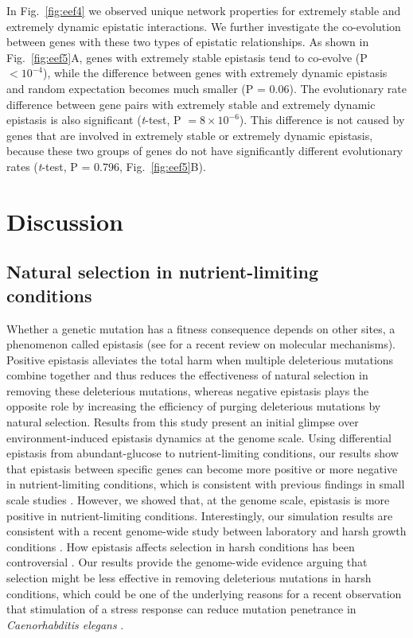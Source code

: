 \documentclass[10pt]{article}
\newcommand{\Fig}{Fig.}
\newcommand{\citep}{\cite}
\newcommand{\citet}{\citep}
\begin{document}
In \Fig~\ref{fig:eef4} we observed unique network properties for extremely stable
and extremely dynamic epistatic interactions. We further investigate
the co-evolution between genes with these two types of epistatic
relationships. As shown in \Fig~\ref{fig:eef5}A, genes with extremely stable
epistasis tend to co-evolve (P $< 10^{-4}$), while the difference between
genes with extremely dynamic epistasis and random expectation becomes
much smaller (P = 0.06). The evolutionary rate difference between gene
pairs with extremely stable and extremely dynamic epistasis is also
significant (\textit{t}-test, P $= 8\times 10^{-6}$). This difference is not caused by
genes that are involved in extremely stable or extremely dynamic
epistasis, because these two groups of genes do not have significantly
different evolutionary rates (\textit{t}-test, P = 0.796, \Fig~\ref{fig:eef5}B).

\section*{Discussion}


\subsection*{Natural selection in nutrient-limiting conditions}

Whether a genetic mutation has a fitness consequence depends on other
sites, a phenomenon called epistasis (see \citet{Lehner2011} for a
recent review on
molecular mechanisms). Positive epistasis alleviates the total harm
when multiple deleterious mutations combine together and thus reduces
the effectiveness of natural selection in removing these deleterious
mutations, whereas negative epistasis plays the opposite role by
increasing the efficiency of purging deleterious mutations by natural
selection. Results from this study present an initial glimpse over
environment-induced epistasis dynamics at the genome scale. Using
differential epistasis from abundant-glucose to nutrient-limiting
conditions, our results show that epistasis between specific genes can
become more positive or more negative in nutrient-limiting conditions,
which is consistent with previous findings in small scale studies
\citep{Remold2001, Kishony2003, Cooper2005, Korona1999, Szafraniec2001,
Jasnos2008, Vassilieva2000, Baer2006, Yang2001, Fry2002,
AletheaD.Wang2009, Young2009}. However, we showed that, at the genome
scale, epistasis is
more positive in nutrient-limiting conditions. Interestingly, our
simulation results are consistent with a recent genome-wide study
between laboratory and harsh growth conditions
\citep{Bandyopadhyay2011}. How epistasis affects selection in harsh
conditions has been controversial \citep{Agrawal2010}. Our
results provide the genome-wide evidence arguing that selection might
be less effective in removing deleterious mutations in harsh
conditions, which could be one of the underlying reasons for a recent
observation that stimulation of a stress response can reduce mutation
penetrance in \textit{Caenorhabditis elegans} \citep{Casanueva2012}.
\end{document}
